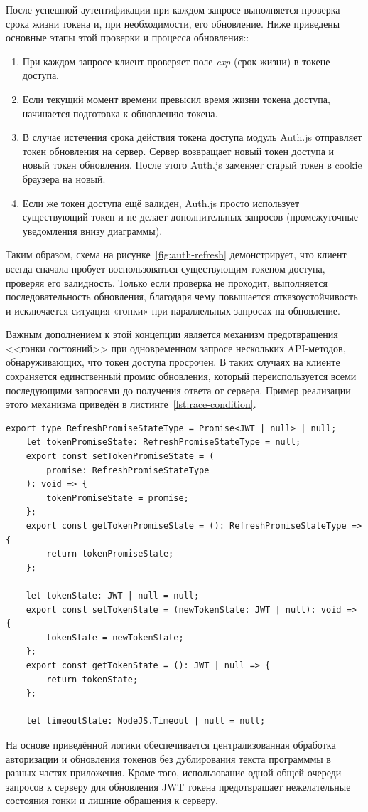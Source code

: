 После успешной аутентификации при каждом запросе выполняется проверка срока жизни токена и, при необходимости, его обновление.  Ниже приведены основные этапы этой проверки и процесса обновления::
\begin{enumerate}
    \item При каждом запросе клиент проверяет поле \textit{exp} (срок жизни) в токене доступа.
    \item Если текущий момент времени превысил время жизни токена доступа, начинается подготовка к обновлению токена.
    \item В случае истечения срока действия токена доступа модуль Auth.js отправляет токен обновления на сервер. Сервер возвращает новый токен доступа и новый токен обновления. После этого Auth.js заменяет старый токен в cookie браузера на новый.
    \item Если же токен доступа ещё валиден, Auth.js просто использует существующий токен и не делает дополнительных запросов (промежуточные уведомления внизу диаграммы).
\end{enumerate}

Таким образом, схема на рисунке~\ref{fig:auth-refresh} демонстрирует, что клиент всегда сначала пробует воспользоваться существующим токеном доступа, проверяя его валидность. Только если проверка не проходит, выполняется последовательность обновления, благодаря чему повышается отказоустойчивость и исключается ситуация «гонки» при параллельных запросах на обновление.

Важным дополнением к этой концепции является механизм предотвращения <<гонки состояний>> при одновременном запросе нескольких API-методов, обнаруживающих, что токен доступа просрочен. В таких случаях на клиенте сохраняется единственный промис обновления, который переиспользуется всеми последующими запросами до получения ответа от сервера. Пример реализации этого механизма приведён в листинге~\ref{lst:race-condition}.

\begin{lstlisting}[caption={Механизм предотвращения race condition при рефреше токена}, label={lst:race-condition}]
	export type RefreshPromiseStateType = Promise<JWT | null> | null;
	let tokenPromiseState: RefreshPromiseStateType = null;
	export const setTokenPromiseState = (
		promise: RefreshPromiseStateType
	): void => {
		tokenPromiseState = promise;
	};
	export const getTokenPromiseState = (): RefreshPromiseStateType => {
		return tokenPromiseState;
	};

	let tokenState: JWT | null = null;
	export const setTokenState = (newTokenState: JWT | null): void => {
		tokenState = newTokenState;
	};
	export const getTokenState = (): JWT | null => {
		return tokenState;
	};

	let timeoutState: NodeJS.Timeout | null = null;
\end{lstlisting}

На основе приведённой логики обеспечивается централизованная обработка авторизации и обновления токенов без дублирования текста программмы в разных частях приложения. Кроме того, использование одной общей очереди запросов к серверу для обновления JWT токена предотвращает нежелательные состояния гонки и лишние обращения к серверу.
